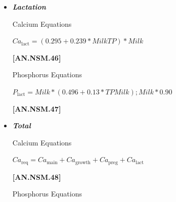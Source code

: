 \documentclass{article}
\begin{document}
\begin{refsection}
\begin{itemize}
\begin{itemize}
The denominator, 715 kg, is the average cow weight in the study by House and Bell (1993); therefore, the pregnancy (gestation) requirement is scaled to that BW. For details see Page 107 in the Minerals chapter of \textcite{nrc2021}. IF DOP $<$ 190; then it is assumed that Ca\_Preg is equal to zero.
\vspace{0.25cm}

    \item \textbf{\textit{Lactation}} 
    \vspace{0.25cm}
    
Calcium Equations
\vspace{0.25cm}

    \begin{center}
    \(Ca_{\text{lact}} =  (0.295 + 0.239 * MilkTP) * Milk\)
    \end{center}

\vspace{0.5cm}
            {\raggedleft \textbf{[AN.NSM.46]}\par}
            \vspace{0.5cm}

Phosphorus Equations
\vspace{0.25cm}

    \begin{center}
    \(P_{\text{lact}} =  Milk * (0.496 + 0.13 * TPMilk); Milk * 0.90\)
    \end{center}

\vspace{0.5cm}
            {\raggedleft \textbf{[AN.NSM.47]}\par}
            \vspace{0.5cm} 

    \item \textbf{\textit{Total}} 
    \vspace{0.25cm}
    
Calcium Equations
\vspace{0.25cm}

    \begin{center}
    \(Ca_{\text{req}} = Ca_{\text{main}} + Ca_{\text{growth}} + Ca_{\text{preg}} + Ca_{\text{lact}}\)
    \end{center}

\vspace{0.5cm}
            {\raggedleft \textbf{[AN.NSM.48]}\par}
            \vspace{0.5cm}

Phosphorus Equations
\vspace{0.25cm}


\end{itemize}
\end{itemize}
\end{refsection}
\end{document}
